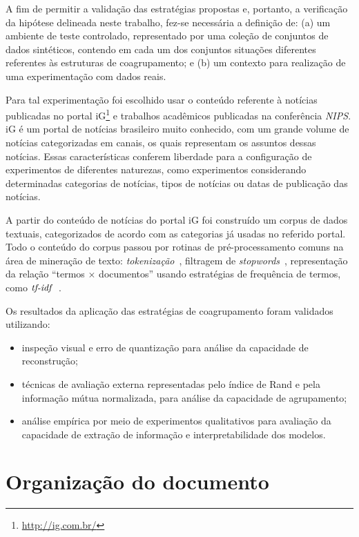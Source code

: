 \documentclass[
    12pt,                %
    oneside,            %
    a4paper,            %
    english,            %
    brazil                %
    ]{abntex2ppgsi}
\begin{document}
A fim de permitir a validação das estratégias propostas e, portanto, a verificação da hipótese delineada neste trabalho, fez-se necessária a definição de: (a) um ambiente de teste controlado, representado por uma coleção de conjuntos de dados sintéticos, contendo em cada um dos conjuntos situações diferentes referentes às estruturas de coagrupamento; e (b) um contexto para realização de uma experimentação com dados reais.

Para tal experimentação foi escolhido usar o conteúdo referente à notícias publicadas no portal iG\footnote{\url{http://ig.com.br/}} e trabalhos acadêmicos publicadas na conferência \textit{NIPS}.
iG é um portal de notícias brasileiro muito conhecido, com um grande volume de notícias categorizadas em canais, os quais representam os assuntos dessas notícias.
Essas características conferem liberdade para a configuração de experimentos de diferentes naturezas, como experimentos considerando determinadas categorias de notícias, tipos de notícias ou datas de publicação das notícias.

A partir do conteúdo de notícias do portal iG foi construído um corpus de dados textuais, categorizados de acordo com as categorias já usadas no referido portal.
Todo o conteúdo do corpus passou por rotinas de pré-processamento comuns na área de mineração de texto: \textit{tokenização}~\cite{Lops2011}, filtragem de \textit{stopwords}~\cite{Lops2011}, representação da relação ``termos $\times$ documentos'' usando estratégias de frequência de termos, como $\text{\textit{tf-idf}}$~\cite{Salton1975}.

Os resultados da aplicação das estratégias de coagrupamento foram validados utilizando:

\begin{itemize}
    \item inspeção visual e erro de quantização para análise da capacidade de reconstrução;
    \item técnicas de avaliação externa representadas pelo índice de Rand e pela informação mútua normalizada, para análise da capacidade de agrupamento;
    \item análise empírica por meio de experimentos qualitativos para avaliação da capacidade de extração de informação e interpretabilidade dos modelos.
\end{itemize}


\section{Organização do documento}
\end{document}
